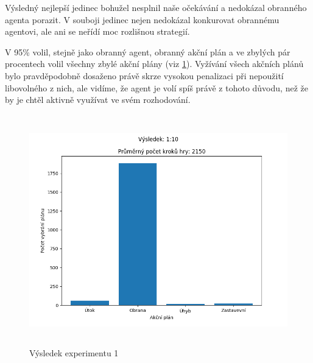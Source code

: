 Výsledný nejlepší jedinec bohužel nesplnil naše očekávání a nedokázal obranného agenta porazit. 
V souboji jedinec nejen nedokázal konkurovat obrannému agentovi, ale ani se neřídí moc rozlišnou strategií.

V 95\% volil, stejně jako obranný agent, obranný akční plán a ve zbylých pár procentech volil všechny zbylé akční plány (viz \ref{Výsledek experimentu 01}).
Vyžívání všech akčních plánů bylo pravděpodobně dosaženo právě skrze vysokou penalizaci při nepoužití libovolného z nich, ale vidíme, že agent je volí spíš právě z tohoto důvodu, než že by je chtěl aktivně využívat ve svém rozhodování.

\begin{figure}[p]\centering
\includegraphics[width=125mm, height=100mm]{./Obrazky/Experiment01Results.png}
\caption{Výsledek experimentu 1}
\label{Výsledek experimentu 01}
\end{figure}




